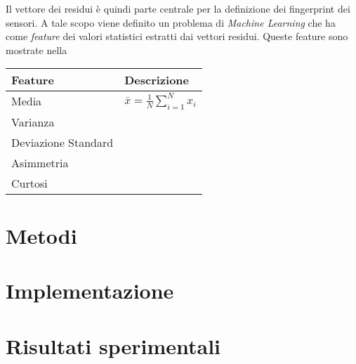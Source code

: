 \documentclass[Lau,binding=0.6cm]{sapthesis}
\begin{document}
Il vettore dei residui \`e quindi parte centrale per la definizione dei fingerprint dei sensori.
A tale scopo viene definito un problema di \textit{Machine Learning} che ha come \textit{feature} dei valori statistici estratti dai vettori residui.
Queste feature sono mostrate nella 


\begin{table}[htbp]
    \begin{center}
    \begin{tabular}{|l|l|}
    \hline
    Feature & Descrizione \\
    \hline
    Media & $\bar{x} = \frac{1}{N}\sum_{i=1}^N x_i$ \\
    \hline
    Varianza \\
    \hline
    Deviazione Standard \\
    \hline
    Asimmetria \\
    \hline
    Curtosi \\
    \hline
    \end{tabular}
    \end{center}
\end{table}



\chapter{Metodi}


\chapter{Implementazione}



\chapter{Risultati sperimentali}
\end{document}

